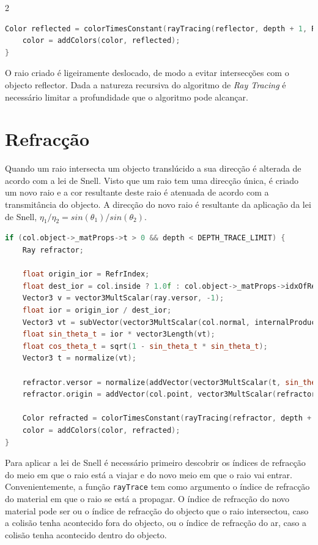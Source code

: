 \documentclass{article}
\begin{document}
\begin{multicols}{2}
\begin{lstlisting}[language=C++]
    Color reflected = colorTimesConstant(rayTracing(reflector, depth + 1, RefrIndex), col.object->_matProps->specularComp);
    color = addColors(color, reflected);
}
\end{lstlisting}

    O raio criado é ligeiramente deslocado, de modo a evitar intersecções com o objecto reflector. Dada a natureza recursiva do algoritmo de \textit{Ray Tracing} é necessário
    limitar a profundidade que o algoritmo pode alcançar.

    \section{Refracção}

    Quando um raio intersecta um objecto translúcido a sua direcção é alterada
    de acordo com a lei de Snell. Visto que um raio tem uma direcção única, é criado
    um novo raio e a cor resultante deste raio é atenuada de acordo com
    a transmitância do objecto. A direcção do novo raio é resultante da aplicação
    da lei de Snell, $\eta_1/\eta_2 = sin(\theta_1)/sin(\theta_2)$.

\begin{lstlisting}[language=C++]
if (col.object->_matProps->t > 0 && depth < DEPTH_TRACE_LIMIT) {
    Ray refractor;

    float origin_ior = RefrIndex;
    float dest_ior = col.inside ? 1.0f : col.object->_matProps->idxOfRefraction;
    Vector3 v = vector3MultScalar(ray.versor, -1);
    float ior = origin_ior / dest_ior;
    Vector3 vt = subVector(vector3MultScalar(col.normal, internalProduct(v, col.normal)), v);
    float sin_theta_t = ior * vector3Length(vt);
    float cos_theta_t = sqrt(1 - sin_theta_t * sin_theta_t);
    Vector3 t = normalize(vt);

    refractor.versor = normalize(addVector(vector3MultScalar(t, sin_theta_t), vector3MultScalar(col.normal, -cos_theta_t)));
    refractor.origin = addVector(col.point, vector3MultScalar(refractor.versor, EPSILON));

    Color refracted = colorTimesConstant(rayTracing(refractor, depth + 1, dest_ior), col.object->_matProps->t);
    color = addColors(color, refracted);
}
\end{lstlisting}

    Para aplicar a lei de Snell é necessário primeiro descobrir os índices de
    refracção do meio em que o raio está a viajar e do novo meio em que o raio
    vai entrar. Convenientemente, a função \verb|rayTrace| tem como argumento
    o índice de refracção do material em que o raio se está a propagar. O
    índice de refracção do novo material pode ser ou o índice de refracção
    do objecto que o raio intersectou, caso a colisão tenha acontecido fora
    do objecto, ou o índice de refracção do ar, caso a colisão tenha acontecido
    dentro do objecto.


\end{multicols}
\end{document}
